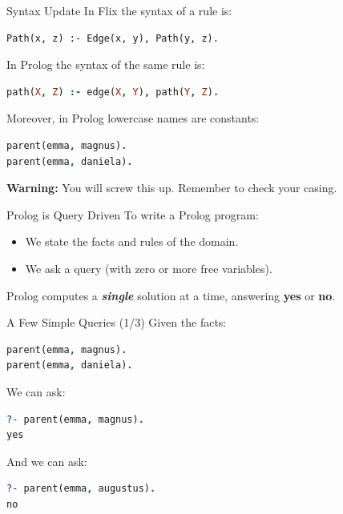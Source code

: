 \begin{frame}[fragile]{Syntax Update}
In Flix the syntax of a rule is:

\begin{lstlisting}[language=flix, xleftmargin=0.5cm]
Path(x, z) :- Edge(x, y), Path(y, z).
\end{lstlisting}

In Prolog the syntax of the same rule is:

\begin{lstlisting}[language=prolog, xleftmargin=0.5cm]
path(X, Z) :- edge(X, Y), path(Y, Z).
\end{lstlisting}

\pause

Moreover, in Prolog lowercase names are constants:

\begin{lstlisting}[language=prolog, xleftmargin=0.5cm]
parent(emma, magnus).
parent(emma, daniela).
\end{lstlisting}

\pause

\textbf{Warning:} You will screw this up. Remember to check your casing. 
\end{frame}

\begin{frame}{Prolog is Query Driven}
To write a Prolog program: 

\begin{itemize}
    \item We state the facts and rules of the domain.
    \item We ask a query (with zero or more free variables).
\end{itemize}

Prolog computes a \textbf{\emph{single}} solution at a time, answering \textbf{yes} or \textbf{no}.
\end{frame}

\begin{frame}[fragile]{A Few Simple Queries (1/3)}
Given the facts:

\begin{lstlisting}[language=prolog, xleftmargin=0.5cm]
parent(emma, magnus).
parent(emma, daniela).
\end{lstlisting}

We can ask:

\begin{lstlisting}[language=prolog, xleftmargin=0.5cm]
?- parent(emma, magnus).
yes
\end{lstlisting}

And we can ask:

\begin{lstlisting}[language=prolog, xleftmargin=0.5cm]
?- parent(emma, augustus).
no
\end{lstlisting}
\end{frame}

